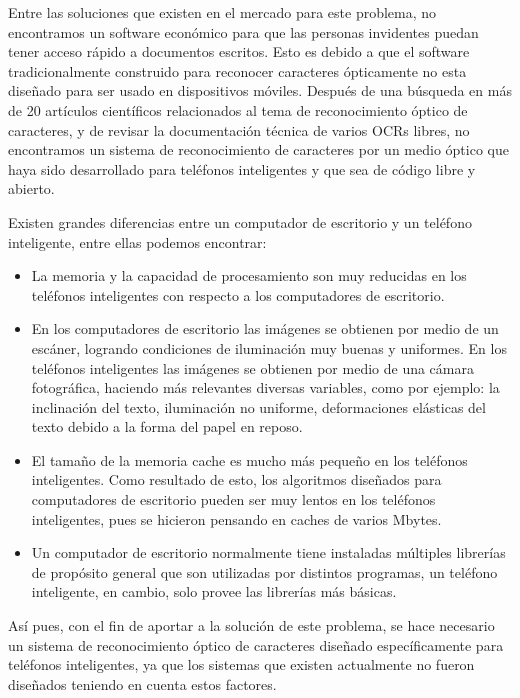 \documentclass[a4paper, 11pt, oneside]{article}
\begin{document}
	Entre las soluciones que existen en el mercado para este problema, no encontramos un software económico para que las personas invidentes puedan tener acceso rápido a documentos escritos. Esto es debido a que el software tradicionalmente construido para reconocer caracteres ópticamente no esta diseñado para ser usado en dispositivos móviles. Después de una búsqueda en más de 20 artículos científicos relacionados al tema de reconocimiento óptico de caracteres, y de revisar la documentación técnica de varios OCRs libres, no encontramos un sistema de reconocimiento de caracteres por un medio óptico que haya sido desarrollado para teléfonos inteligentes y que sea de código libre y abierto.

	Existen grandes diferencias entre un computador de escritorio y un teléfono inteligente, entre ellas podemos encontrar:
	\begin{itemize}
	\item La memoria y la capacidad de procesamiento son muy reducidas en los teléfonos inteligentes con respecto a los computadores de escritorio.

	\item En los computadores de escritorio las imágenes se obtienen por medio de un escáner, logrando condiciones de iluminación muy buenas y uniformes. En los teléfonos inteligentes las imágenes se obtienen por medio de una cámara fotográfica, haciendo más relevantes diversas variables, como por ejemplo: la inclinación del texto, iluminación no uniforme, deformaciones elásticas del texto debido a la forma del papel en reposo.

	\item El tamaño de la memoria cache es mucho más pequeño en los teléfonos inteligentes. Como resultado de esto, los algoritmos diseñados para computadores de escritorio pueden ser muy lentos en los teléfonos inteligentes, pues se hicieron pensando en caches de varios Mbytes.

	\item Un computador de escritorio normalmente tiene instaladas múltiples librerías de propósito general que son utilizadas por distintos programas, un teléfono inteligente, en cambio, solo provee las librerías más básicas.
	\end{itemize}

	Así pues, con el fin de aportar a la solución de este problema, se hace necesario un sistema de reconocimiento óptico de caracteres diseñado específicamente para teléfonos inteligentes, ya que los sistemas que existen actualmente no fueron diseñados teniendo en cuenta estos factores. 
\clearpage
\end{document}
